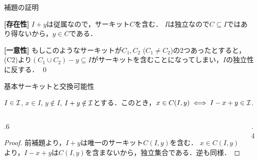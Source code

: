 \documentclass[14pt,aspectratio=169,xcolor=dvipsnames,table,onlytextwidth,dvipdfmx]{beamer}
\begin{document}
\begin{frame}{補題の証明} 
    \circuitaxiompostit

    \textbf{[存在性]}
    $I+y$は従属なので，サーキット$C$を含む．
    $I$は独立なので$C \subseteq I$ではあり得ないから，$y \in C$である．

    \bigskip
    \textbf{[一意性]}
    もしこのようなサーキットが$C_1, C_2$ ($C_1\neq C_2$)の2つあったとすると，(C2)より$(C_1 \cup C_2)- y\subseteq I$がサーキットを含むことになってしまい，$I$の独立性に反する． \qed

\end{frame}

\begin{frame}{基本サーキットと交換可能性}
    \begin{lemma}
        $I \in \mathcal{I}$, $x \in I$, $y \notin I$, $I + y \notin \mathcal{I}$とする．このとき，$x \in C(I, y) \iff I - x + y \in \mathcal{I}$.
    \end{lemma}
    
    \begin{columns}
    \begin{column}{.6\textwidth}
    \begin{proof}
    前補題より，$I + y$は唯一のサーキット$C(I, y)$を含む．
    $x \in C(I, y)$より，$I - x + y$は$C(I, y)$を含まないから，独立集合である．逆も同様． 
    \end{proof}
    \end{column}
    \begin{column}{.4\textwidth}
        \centering
    \end{column}
    \end{columns}

\end{frame}
\end{document}

